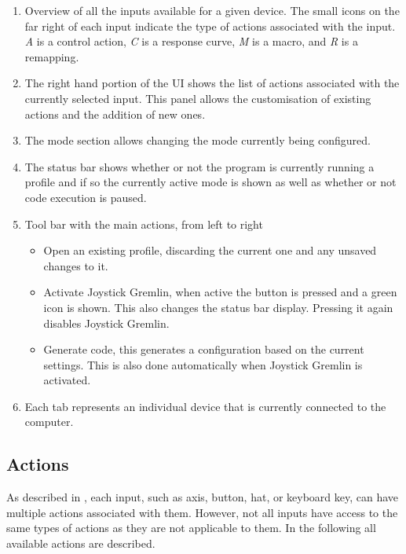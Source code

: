 \documentclass[a4, 10pt]{article}
\newcommand{\JG}{Joystick Gremlin}
\begin{document}
\begin{enumerate}
    \item Overview of all the inputs available for a given device. The
        small icons on the far right of each input indicate the type of
        actions associated with the input. \emph{A} is a control action,
        \emph{C} is a response curve, \emph{M} is a macro, and \emph{R} is
        a remapping.
    \item The right hand portion of the UI shows the list of actions
        associated with the currently selected input. This panel allows
        the customisation of existing actions and the addition of new
        ones.
    \item The mode section allows changing the mode currently being
        configured.
    \item The status bar shows whether or not the program is currently
        running a profile and if so the currently active mode is shown
        as well as whether or not code execution is paused.
    \item Tool bar with the main actions, from left to right
        \begin{itemize}
            \item Open an existing profile, discarding the current one
                and any unsaved changes to it.
            \item Activate \JG{}, when active the button is pressed and
                a green icon is shown. This also changes the status bar
                display. Pressing it again disables \JG{}.
            \item Generate code, this generates a configuration based on
                the current settings. This is also done automatically
                when \JG{} is activated.
        \end{itemize}
    \item Each tab represents an individual device that is currently
        connected to the computer.
\end{enumerate}


\subsection{Actions}

As described in , each input, such as axis, button,
hat, or keyboard key, can have multiple actions associated with them.
However, not all inputs have access to the same types of actions as they
are not applicable to them. In the following all available actions are
described.
\end{document}
